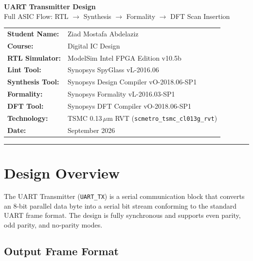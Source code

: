 \documentclass[12pt,a4paper]{article}
\begin{document}
\begin{titlepage}
\centering
\vspace*{1.5cm}
{\Huge\bfseries\color{headerblue} UART Transmitter Design\\[0.3em]}
{\Large\color{gray} Full ASIC Flow: RTL $\to$ Synthesis $\to$ Formality $\to$ DFT Scan Insertion\\[2.5cm]}

\begin{tabular}{ll}
\textbf{Student Name:} & Ziad Mostafa Abdelaziz \\[0.5em]
\textbf{Course:}       & Digital IC Design \\[0.5em]
\textbf{RTL Simulator:}& ModelSim Intel FPGA Edition v10.5b \\[0.5em]
\textbf{Lint Tool:}    & Synopsys SpyGlass vL-2016.06 \\[0.5em]
\textbf{Synthesis Tool:}& Synopsys Design Compiler vO-2018.06-SP1 \\[0.5em]
\textbf{Formality:}& Synopsys Formality vL-2016.03-SP1 \\[0.5em]
\textbf{DFT Tool:}& Synopsys DFT Compiler vO-2018.06-SP1 \\[0.5em]
\textbf{Technology:}& TSMC 0.13\,$\mu$m RVT (\texttt{scmetro\_tsmc\_cl013g\_rvt}) \\[0.5em]
\textbf{Date:}         & September 2026 \\
\end{tabular}

\vfill
\rule{\linewidth}{1pt}
\end{titlepage}

\tableofcontents
\newpage

\section{Design Overview}

The UART Transmitter (\texttt{UART\_TX}) is a serial communication block that converts an 8-bit parallel data byte into a serial bit stream conforming to the standard UART frame format. The design is fully synchronous and supports even parity, odd parity, and no-parity modes.

\subsection{Output Frame Format}
\end{document}
